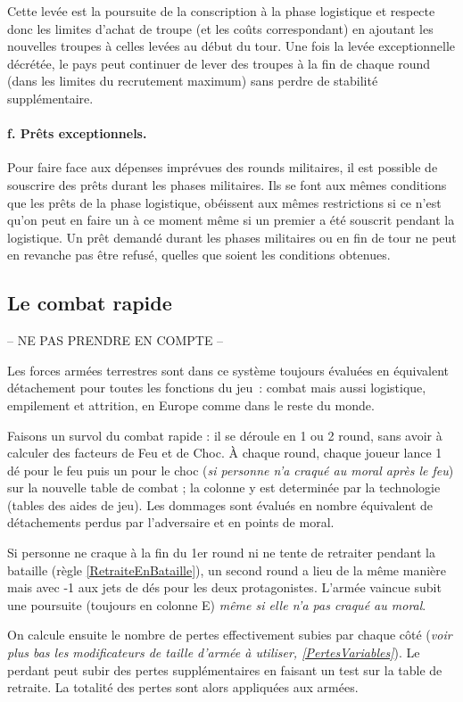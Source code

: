 Cette levée est la poursuite de la conscription
à la phase logistique et respecte donc les limites d'achat de troupe
(et les coûts correspondant) en ajoutant les nouvelles troupes
à celles levées au début du tour. Une fois la levée exceptionnelle
décrétée, le pays peut continuer de lever des troupes à la fin de chaque
round (dans les limites du recrutement maximum) sans perdre
de stabilité supplémentaire.

\paragraph{f. Prêts exceptionnels.}
Pour faire face aux dépenses imprévues des rounds militaires,
il est possible de souscrire des prêts durant les phases militaires.
Ils se font aux mêmes conditions que les prêts de la phase logistique,
obéissent aux mêmes restrictions si ce n'est qu'on peut en faire
un à ce moment même si un premier a été souscrit pendant la
logistique. Un prêt demandé durant les phases militaires ou
en fin de tour ne peut en revanche pas être refusé, quelles que soient
les conditions obtenues.


\subsection{Le combat rapide}
-- NE PAS PRENDRE EN COMPTE --

Les forces armées terrestres sont dans ce système toujours évaluées en équivalent détachement 
pour toutes les fonctions du jeu~: combat mais aussi logistique, empilement
et attrition, en Europe comme dans le reste du monde.

Faisons un survol du combat rapide : il se déroule en 1 ou 2 round, sans avoir
à calculer des facteurs de Feu et de Choc. À 
chaque round, chaque joueur lance 1 dé pour le feu puis un pour le choc (\textit{si 
personne n'a craqué au moral après le feu}) sur la nouvelle table de combat ; la colonne y est 
determinée par la technologie (tables des aides de jeu). Les dommages sont 
évalués en nombre équivalent de détachements perdus par l'adversaire et en 
points de moral. 

Si personne ne craque à la fin du 1er round ni ne tente
de retraiter pendant la bataille (règle \ref{RetraiteEnBataille}), un second round 
a lieu de la même manière mais avec -1 aux jets de dés pour les deux protagonistes. 
L'armée vaincue subit une poursuite (toujours en colonne E)
\textit{même si elle n'a pas craqué au moral}.

On calcule ensuite le nombre de pertes effectivement subies par chaque côté 
(\textit{voir plus bas les modificateurs de taille d'armée à utiliser, \ref{PertesVariables}}). 
Le perdant peut subir des pertes supplémentaires en faisant un test sur la 
table de retraite. La totalité des pertes sont alors appliquées aux armées.

